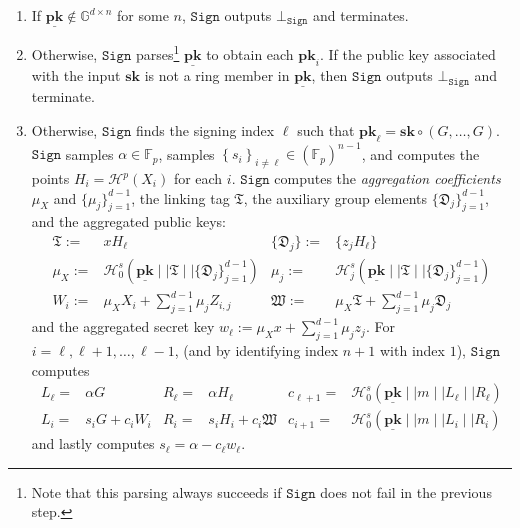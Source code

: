 \documentclass[draft]{llncs} %
\begin{document}
\begin{definition}[$d$-CLSAG]
\begin{itemize}
\begin{enumerate}
\item If $\underline{\textbf{pk}} \notin \mathbb{G}^{d\times n}$ for some $n$, $\texttt{Sign}$ outputs $\bot_{\texttt{Sign}}$ and terminates.

\item Otherwise, $\texttt{Sign}$ parses\footnote{Note that this parsing always succeeds if $\texttt{Sign}$ does not fail in the previous step.} $\underline{\textbf{pk}}$ to obtain each $\textbf{pk}_i$. If the public key associated with the input $\textbf{sk}$ is not a ring member in $\underline{\textbf{pk}}$, then $\texttt{Sign}$ outputs $\bot_{\texttt{Sign}}$ and terminate.

\item Otherwise, $\texttt{Sign}$ finds the signing index $\ell$ such that $\textbf{pk}_\ell = \textbf{sk} \circ (G, \ldots, G)$. $\texttt{Sign}$ samples $\alpha \in \mathbb{F}_p$, samples $\left\{s_i\right\}_{i \neq \ell} \in (\mathbb{F}_p)^{n-1}$, and computes the points $H_i = \mathcal{H}^p(X_i)$ for each $i$. $\texttt{Sign}$ computes the \textit{aggregation coefficients} $\mu_X$ and $\{\mu_j\}_{j=1}^{d-1}$, the linking tag $\mathfrak{T}$, the auxiliary group elements $\{\mathfrak{D}_j\}_{j=1}^{d-1}$, and the aggregated public keys:
\begin{align*}
\mathfrak{T} :=& x H_\ell & \{\mathfrak{D}_j\} :=&  \{z_j H_\ell\} \\
\mu_X :=& \mathcal{H}^s_0(\underline{\textbf{pk}} \mid \mid \mathfrak{T} \mid \mid \{\mathfrak{D}_j\}_{j=1}^{d-1})
 & \mu_j :=& \mathcal{H}^s_j(\underline{\textbf{pk}} \mid \mid \mathfrak{T} \mid \mid \{\mathfrak{D}_j\}_{j=1}^{d-1}) \\
 W_i :=& \mu_X X_i + \sum_{j=1}^{d-1} \mu_j Z_{i,j} & \mathfrak{W} :=& \mu_X \mathfrak{T} + \sum_{j=1}^{d-1} \mu_j \mathfrak{D}_j
 \end{align*} and the aggregated secret key $w_\ell :=  \mu_X x + \sum_{j=1}^{d-1} \mu_j z_j$. For $i = \ell, \ell+1, \ldots, \ell-1$, (and by identifying index $n+1$ with index $1$), $\texttt{Sign}$ computes
\begin{align*}
L_\ell =& \alpha G & R_\ell =& \alpha H_\ell & c_{\ell+1} =& \mathcal{H}^s_0(\underline{\textbf{pk}} \mid \mid m \mid \mid L_\ell \mid \mid R_\ell) \\
L_i =& s_i G + c_i W_i & R_i =& s_i H_i + c_i \mathfrak{W}
 & c_{i+1} =& \mathcal{H}^s_0(\underline{\textbf{pk}} \mid \mid m \mid \mid L_i \mid \mid R_i)
\end{align*} and lastly computes $s_\ell = \alpha - c_\ell w_\ell$.


\end{enumerate}
\end{itemize}
\end{definition}
\end{document}
